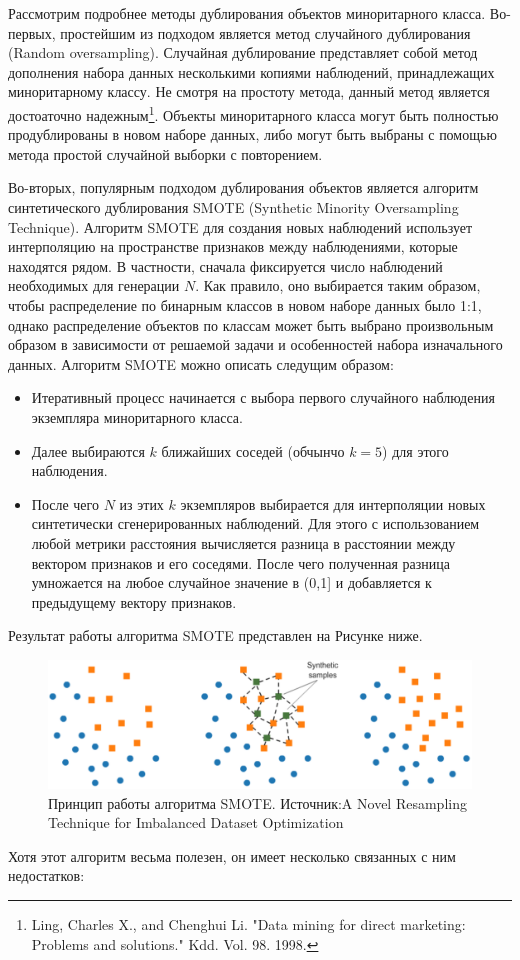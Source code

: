 \documentclass[12pt,a4paper, oneside]{extreport}
\begin{document}
Рассмотрим подробнее методы дублирования объектов миноритарного класса. 
Во-первых, простейшим из подходом является метод случайного дублирования (Random oversampling). 
Случайная дублирование представляет собой метод дополнения набора данных несколькими копиями наблюдений, принадлежащих миноритарному  классу. Не смотря на простоту метода, данный метод является достоаточно надежным\footnote{Ling, Charles X., and Chenghui Li. "Data mining for direct marketing: Problems and solutions." Kdd. Vol. 98. 1998.}.   Объекты миноритарного класса могут быть полностью продублированы в новом наборе данных, либо могут быть выбраны с помощью метода простой случайной выборки с повторением.


Во-вторых, популярным подходом дублирования объектов является алгоритм синтетического дублирования SMOTE (Synthetic Minority Oversampling Technique). 
Алгоритм SMOTE для создания новых наблюдений использует интерполяцию  на пространстве признаков    между наблюдениями, которые находятся рядом.
В частности, сначала фиксируется   число наблюдений необходимых  для генерации $N$. Как правило, оно выбирается таким образом, чтобы распределение по бинарным классов в новом наборе данных было 1:1, однако распределение объектов по классам  может быть выбрано произвольным образом в зависимости от решаемой задачи и особенностей набора изначального данных. Алгоритм SMOTE  можно описать следущим образом: 
\begin{itemize}
	\item Итеративный процесс   начинается с выбора первого случайного наблюдения  экземпляра миноритарного класса.
	\item   Далее выбираются $k$  ближайших  соседей (обчынчо $k=5$) для этого наблюдения. 
	\item  После чего  $N$  из этих $k$  экземпляров выбирается для интерполяции новых синтетически сгенерированных наблюдений. Для этого с использованием любой метрики расстояния вычисляется разница в расстоянии между вектором признаков и его соседями. После чего полученная разница умножается на любое случайное значение в (0,1] и добавляется к предыдущему вектору признаков. 	
\end{itemize}

Результат работы алгоритма SMOTE представлен на Рисунке ниже.

\begin{figure}[H]
	\centering
	\includegraphics[width=1\linewidth]{screenshot007}
    \caption{Принцип работы алгоритма SMOTE. Источник:A Novel Resampling Technique for Imbalanced Dataset Optimization}
	\label{fig:screenshot007}
\end{figure}
Хотя этот алгоритм весьма полезен, он имеет несколько связанных с ним недостатков:
\end{document}

